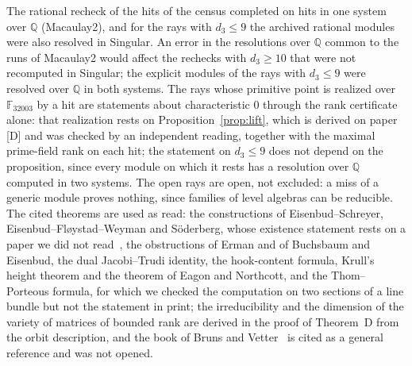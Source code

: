 \documentclass[11pt]{article}
\theoremstyle{definition}
\theoremstyle{remark}
\newcommand{\Q}{\mathbb{Q}}
\newcommand{\F}{\mathbb{F}}
\begin{document}
The rational recheck of the hits of the census completed on \nqqOk{} hits in one system over $\Q$ (Macaulay2), and for the rays with $d_3\le9$ the archived rational modules were also resolved in Singular. An error in the resolutions over $\Q$ common to the runs of Macaulay2 would affect the \nqqOk{} rechecks with $d_3\ge10$ that were not recomputed in Singular; the explicit modules of the rays with $d_3\le9$ were resolved over $\Q$ in both systems. The \nrealizedPrimeOnly{} rays whose primitive point is realized over $\F_{32003}$ by a hit are statements about characteristic $0$ through the rank certificate alone: that realization rests on Proposition~\ref{prop:lift}, which is derived on paper [D] and was checked by an independent reading, together with the maximal prime-field rank on each hit; the statement on $d_3\le9$ does not depend on the proposition, since every module on which it rests has a resolution over $\Q$ computed in two systems. The \nopen{} open rays are open, not excluded: a miss of a generic module proves nothing, since families of level algebras can be reducible. The cited theorems are used as read: the constructions of Eisenbud--Schreyer, Eisenbud--Fl{\o}ystad--Weyman and S\"oderberg, whose existence statement rests on a paper we did not read~\cite{Boij00}, the obstructions of Erman and of Buchsbaum and Eisenbud, the dual Jacobi--Trudi identity, the hook-content formula, Krull's height theorem and the theorem of Eagon and Northcott, and the Thom--Porteous formula, for which we checked the computation on two sections of a line bundle but not the statement in print; the irreducibility and the dimension of the variety of matrices of bounded rank are derived in the proof of Theorem~D from the orbit description, and the book of Bruns and Vetter~\cite{BV} is cited as a general reference and was not opened.
\end{document}
